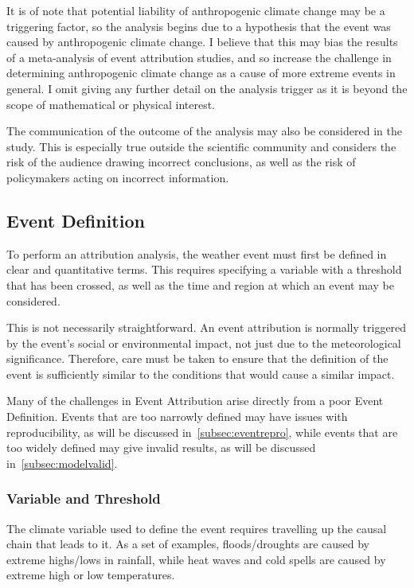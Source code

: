 \documentclass[12pt,a4paper]{report}
\begin{document}
It is of note that potential liability of anthropogenic climate change may be a triggering factor,
    so the analysis begins due to a hypothesis that the event was caused by anthropogenic climate change.
I believe that this may bias the results of a meta-analysis of event attribution studies,
    and so increase the challenge in determining anthropogenic climate change as a cause of more extreme events in general.
I omit giving any further detail on the analysis trigger as it is beyond the scope of mathematical or physical interest.

The communication of the outcome of the analysis may also be considered in the study.
This is especially true outside the scientific community
    and considers the risk of the audience drawing incorrect conclusions,
    as well as the risk of policymakers acting on incorrect information.


\subsection{Event Definition}\label{subsec:backeventdef}

To perform an attribution analysis,
    the weather event must first be defined in clear and quantitative terms.
This requires specifying a variable with a threshold that has been crossed,
    as well as the time and region at which an event may be considered.

This is not necessarily straightforward.
An event attribution is normally triggered by the event's social or environmental impact,
     not just due to the meteorological significance.
Therefore, care must be taken to ensure that the definition of the event is sufficiently similar to the conditions that would cause a similar impact.

Many of the challenges in Event Attribution arise directly from a poor Event Definition.
Events that are too narrowly defined may have issues with reproducibility,
    as will be discussed in~\ref{subsec:eventrepro},
    while events that are too widely defined may give invalid results,
    as will be discussed in~\ref{subsec:modelvalid}.

\subsubsection{Variable and Threshold}

The climate variable used to define the event requires travelling up the causal chain that leads to it.
As a set of examples,
    floods/droughts are caused by extreme highs/lows in rainfall,
    while heat waves and cold spells are caused by extreme high or low temperatures.
\end{document}
